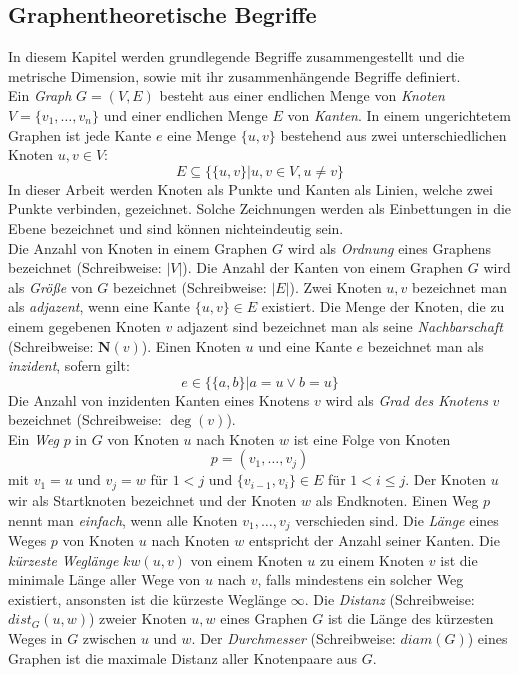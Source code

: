 \subsection{Graphentheoretische Begriffe}
\label{chap_prel}
In diesem Kapitel werden grundlegende Begriffe zusammengestellt und die metrische Dimension, sowie mit ihr zusammenhängende Begriffe definiert.\\
Ein \emph{Graph} $G = (V, E)$ besteht aus einer endlichen Menge von \emph{Knoten} $V = \{v_1 ,\ldots, v_n\}$ und einer endlichen Menge $E$ von \emph{Kanten}. In einem ungerichtetem Graphen ist jede Kante $e$ eine Menge $\{u, v\}$ bestehend aus zwei unterschiedlichen Knoten $u, v \in V$:
$$E \subseteq \{\{u, v\} | u, v \in V, u \neq v\}$$
In dieser Arbeit werden Knoten als Punkte und Kanten als Linien, welche zwei Punkte verbinden, gezeichnet. Solche Zeichnungen werden als Einbettungen in die Ebene bezeichnet und sind können nichteindeutig sein.\\ Die Anzahl von Knoten in einem Graphen $G$ wird als \emph{Ordnung} eines Graphens bezeichnet (Schreibweise: $|V|$). Die Anzahl der Kanten von einem Graphen $G$ wird als \emph{Größe} von $G$ bezeichnet (Schreibweise: $|E|$). Zwei Knoten $u,v$ bezeichnet man als \emph{adjazent}, wenn eine Kante $\{u, v\} \in E$ existiert. Die Menge der Knoten, die zu einem gegebenen Knoten $v$ adjazent sind bezeichnet man als seine \emph{Nachbarschaft} (Schreibweise: $\mathbf{N}(v)$). Einen Knoten $u$ und eine Kante $e$ bezeichnet man als \emph{inzident}, sofern gilt: $$e \in \{\{a,b\}|a=u \vee b=u\}$$ Die Anzahl von inzidenten Kanten eines Knotens $v$ wird als \emph{Grad des Knotens} $v$ bezeichnet (Schreibweise: $\deg(v)$).\\
Ein \emph{Weg} $p$ in $G$ von Knoten $u$ nach Knoten $w$ ist eine Folge von Knoten $$p=(v_1,\ldots,v_j)$$ mit $v_1=u$ und $v_j=w$ für $1<j$ und $\{v_{i-1},v_i\}\in E$ für $1 <i \leq j$. Der Knoten $u$ wir als Startknoten bezeichnet und der Knoten $w$ als Endknoten. Einen Weg $p$ nennt man \emph{einfach}, wenn alle Knoten $v_1,\ldots,v_j$ verschieden sind. Die \emph{Länge} eines Weges $p$ von Knoten $u$ nach Knoten $w$ entspricht der Anzahl seiner Kanten. Die \emph{kürzeste Weglänge} $kw(u, v)$ von einem Knoten $u$ zu einem Knoten $v$ ist die minimale Länge aller Wege von $u$ nach $v$, falls mindestens ein solcher Weg existiert, ansonsten ist die kürzeste Weglänge $\infty$.
Die \emph{Distanz} (Schreibweise: $dist_G(u,w)$) zweier Knoten $u,w$ eines Graphen $G$ ist die Länge des kürzesten Weges in $G$ zwischen $u$ und $w$. Der \emph{Durchmesser} (Schreibweise: $diam(G)$) eines Graphen ist die maximale Distanz aller Knotenpaare aus $G$.
